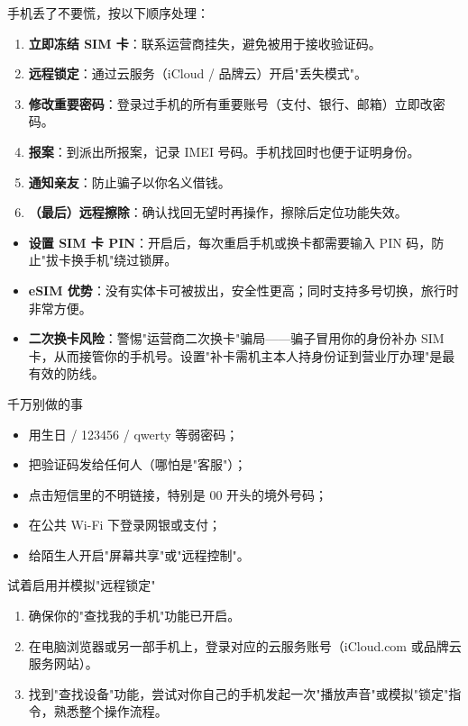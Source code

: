 
手机丢了不要慌，按以下顺序处理：

\begin{enumerate}
  \item \textbf{立即冻结 SIM 卡}：联系运营商挂失，避免被用于接收验证码。
  \item \textbf{远程锁定}：通过云服务（iCloud / 品牌云）开启"丢失模式"。
  \item \textbf{修改重要密码}：登录过手机的所有重要账号（支付、银行、邮箱）立即改密码。
  \item \textbf{报案}：到派出所报案，记录 IMEI 号码。手机找回时也便于证明身份。
  \item \textbf{通知亲友}：防止骗子以你名义借钱。
  \item \textbf{（最后）远程擦除}：确认找回无望时再操作，擦除后定位功能失效。
\end{enumerate}


\begin{itemize}
  \item \textbf{设置 SIM 卡 PIN}：开启后，每次重启手机或换卡都需要输入 PIN 码，防止"拔卡换手机"绕过锁屏。
  \item \textbf{eSIM 优势}：没有实体卡可被拔出，安全性更高；同时支持多号切换，旅行时非常方便。
  \item \textbf{二次换卡风险}：警惕"运营商二次换卡"骗局——骗子冒用你的身份补办 SIM 卡，从而接管你的手机号。设置"补卡需机主本人持身份证到营业厅办理"是最有效的防线。
\end{itemize}

\begin{tcbwarn}{千万别做的事}
\begin{itemize}
  \item 用生日 / 123456 / qwerty 等弱密码；
  \item 把验证码发给任何人（哪怕是"客服"）；
  \item 点击短信里的不明链接，特别是 00 开头的境外号码；
  \item 在公共 Wi-Fi 下登录网银或支付；
  \item 给陌生人开启"屏幕共享"或"远程控制"。
\end{itemize}

\end{tcbwarn}

\begin{tcbpractice}{试着启用并模拟"远程锁定"}
\begin{enumerate}
  \item 确保你的"查找我的手机"功能已开启。
  \item 在电脑浏览器或另一部手机上，登录对应的云服务账号（iCloud.com 或品牌云服务网站）。
  \item 找到"查找设备"功能，尝试对你自己的手机发起一次"播放声音"或模拟"锁定"指令，熟悉整个操作流程。
\end{enumerate}

\end{tcbpractice}
